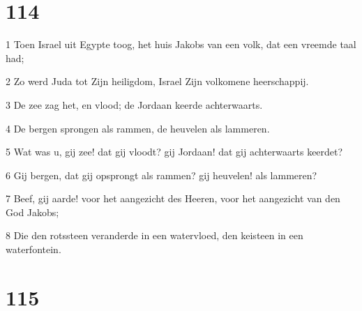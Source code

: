\chapter{114}

\par 1 Toen Israel uit Egypte toog, het huis Jakobs van een volk, dat een vreemde taal had;
\par 2 Zo werd Juda tot Zijn heiligdom, Israel Zijn volkomene heerschappij.
\par 3 De zee zag het, en vlood; de Jordaan keerde achterwaarts.
\par 4 De bergen sprongen als rammen, de heuvelen als lammeren.
\par 5 Wat was u, gij zee! dat gij vloodt? gij Jordaan! dat gij achterwaarts keerdet?
\par 6 Gij bergen, dat gij opsprongt als rammen? gij heuvelen! als lammeren?
\par 7 Beef, gij aarde! voor het aangezicht des Heeren, voor het aangezicht van den God Jakobs;
\par 8 Die den rotssteen veranderde in een watervloed, den keisteen in een waterfontein.

\chapter{115}


